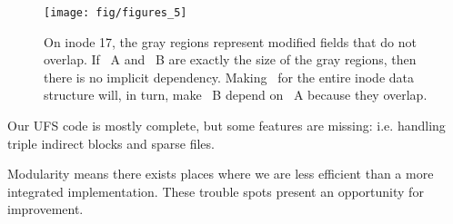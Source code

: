 \begin{figure}[htb]
  \centering
  \texttt{[image: fig/figures\_5]}
  \caption{\label{fig:overlap} On inode 17, the gray regions represent
  modified fields that do not overlap. If \chdesc\ A and \chdesc\ B are exactly
  the size of the gray regions, then there is no implicit dependency.
  Making \chdescs\ for the entire inode data structure will, in turn, make
  \chdesc\ B depend on \chdesc\ A because they overlap.}
\end{figure}

Our UFS code is mostly complete, but some features are missing:
i.e. handling triple indirect blocks and sparse files.

Modularity means there exists places where we are less efficient
than a more integrated implementation. These trouble spots present
an opportunity for improvement.


